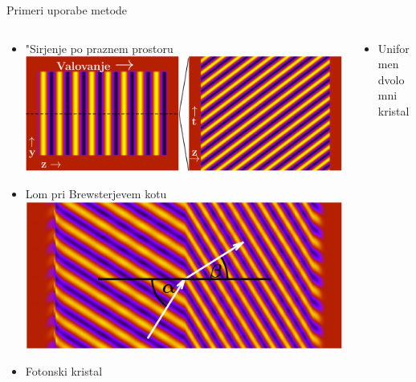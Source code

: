 \documentclass{beamer}
\begin{document}
\begin{frame}{Primeri uporabe metode}
\begin{columns}[c]

\begin{column}[T]{.5\textwidth}
\begin{itemize}
 \item "Sirjenje po praznem prostoru
 \includegraphics[width=.9\textwidth]{./Slike/empty}
 
 \item Lom pri Brewsterjevem kotu
 \includegraphics[width=.9\textwidth]{./Slike/refraction}

 \item Fotonski kristal

\end{itemize}

\end{column}

\begin{column}[T]{.5\textwidth}
\begin{itemize}
  \item Uniformen dvolomni kristal \\
  \hspace{-.5cm}\resizebox{.9\textwidth}{!}{}
  

\end{itemize}
\end{column}
\end{columns}
\end{frame}
\end{document}
